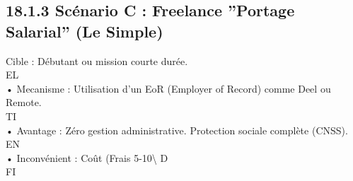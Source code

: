 \subsection{18.1.3 Scénario C : Freelance ”Portage Salarial” (Le Simple)}
Cible : Débutant ou mission courte durée.\\
\vspace{0.5em}
\vspace{0.5em}
\vspace{0.5em}
\vspace{0.5em}
EL\\
• Mecanisme : Utilisation d’un EoR (Employer of Record) comme Deel ou Remote.\\
\vspace{0.5em}
\vspace{0.5em}
\vspace{0.5em}
\vspace{0.5em}
TI\\
• Avantage : Zéro gestion administrative. Protection sociale complète (CNSS).\\
\vspace{0.5em}
\vspace{0.5em}
\vspace{0.5em}
\vspace{0.5em}
EN\\
• Inconvénient : Coût (Frais 5-10\textbackslash{}%
\vspace{0.5em}
\vspace{0.5em}
\vspace{0.5em}
\vspace{0.5em}
D\\
FI\\
